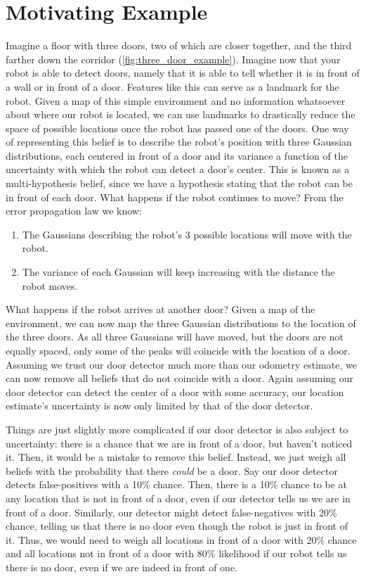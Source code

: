 \section{Motivating Example}
Imagine a floor with three doors, two of which are closer together, and the third farther down the corridor (\cref{fig:three_door_example}). Imagine now that your robot is able to detect doors, namely that it is able to tell whether it is in front of a wall or in front of a door. Features like this can serve as a landmark for the robot. Given a map of this simple environment and no information whatsoever about where our robot is located, we can use landmarks to drastically reduce the space of possible locations once the robot has passed one of the doors. One way of representing this belief is to describe the robot's position with three Gaussian distributions, each centered in front of a door and its variance a function of the uncertainty with which the robot can detect a door's center. This is known as a multi-hypothesis belief, since we have a hypothesis stating that the robot can be in front of each door. What happens if the robot continues to move? From the error propagation law we know:
\begin{enumerate}
\item The Gaussians describing the robot's 3 possible locations will move with the robot.
\item The variance of each Gaussian will keep increasing with the distance the robot moves.
\end{enumerate}
What happens if the robot arrives at another door? Given a map of the environment, we can now map the three Gaussian distributions to the location of the three doors. As all three Gaussians will have moved, but the doors are not equally spaced, only some of the peaks will coincide with the location of  a door. Assuming we trust our door detector much more than our odometry estimate, we can now remove all beliefs that do not coincide with a door. Again assuming our door detector can detect the center of a door with some accuracy, our location estimate's uncertainty is now only limited by that of the door detector.


Things are just slightly more complicated if our door detector is also subject to uncertainty: there is a chance that we are in front of a door, but haven't noticed it. Then, it would be a mistake to remove this belief. Instead, we just weigh all beliefs with the probability that there \textsl{could} be a door. Say our door detector detects false-positives with a 10\% chance. Then, there is a 10\% chance to be at any location that is not in front of a door, even if our detector tells us we are in front of a door. Similarly, our detector might detect false-negatives with 20\% chance, telling us that there is no door even though the robot is just in front of it. Thus, we would need to weigh all locations in front of a door with 20\% chance and all locations not in front of a door with 80\% likelihood if our robot tells us there is no door, even if we are indeed in front of one.

